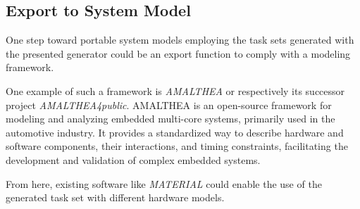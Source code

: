 \subsection{Export to System Model}\label{subsec:future_work:export_to_amalthea}
One step toward portable system models employing the task sets generated with the presented generator could be an export function to comply with a modeling framework.

One example of such a framework is \textit{AMALTHEA}\cite{itea2officeAMALTHEAProjectResults2015} or respectively its successor project \textit{AMALTHEA4public}\cite{johan.van.der.heide[at]itea4.orgITEA4Project}.
AMALTHEA is an open-source framework for modeling and analyzing embedded multi-core systems, primarily used in the automotive industry. 
It provides a standardized way to describe hardware and software components, their interactions, and timing constraints, facilitating the development and validation of complex embedded systems.

From here, existing software like \textit{MATERIAL}\cite{beckerMATERIALFrameworkModeling2024} could enable the use of the generated task set with different hardware models.

